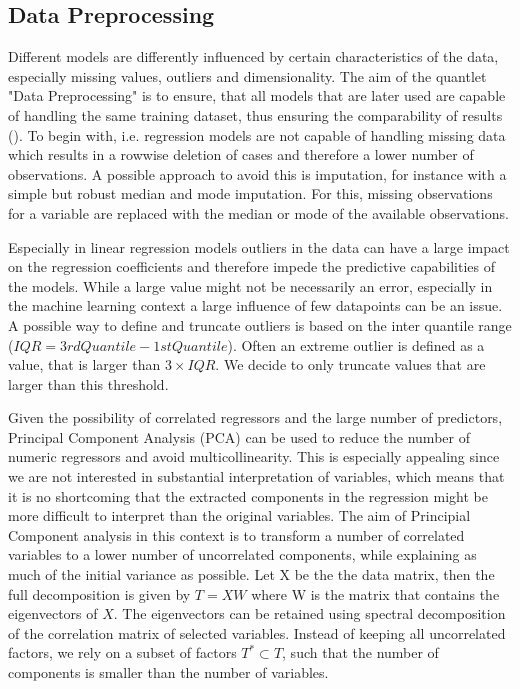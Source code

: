 \subsection{Data Preprocessing}\label{sec:data_theory}

Different models are differently influenced by certain characteristics of the data, especially missing values, outliers and dimensionality.  The aim of the quantlet "Data Preprocessing" is to ensure, that all models that are later used are capable of handling the same training dataset, thus ensuring the comparability of results (\cite{friedman_elements_2001}). 
To begin with, i.e. regression models are not capable of handling missing data which results in a rowwise deletion of cases and therefore a lower number of observations. A possible approach to avoid this is  imputation, for instance with a simple but robust median and mode imputation. For this, missing observations for a variable are replaced with the median or mode of the available observations.

Especially in linear regression models outliers in the data can have a large impact on the regression coefficients and therefore impede the predictive  capabilities of the  models. While a large value might not be necessarily an error, especially in the machine learning context a large influence of few datapoints can be an issue. A possible way to define and truncate outliers is based on the inter quantile range ($IQR = 3rd Quantile -1st Quantile$).
Often an extreme outlier is defined as a value, that is larger than $3 \times IQR$. We decide to only truncate values that are larger than this threshold. 

Given the possibility of correlated regressors and the large number of predictors, Principal Component Analysis (PCA) can be used to reduce the number of numeric regressors and avoid multicollinearity. This is especially appealing since we are not interested in substantial interpretation of variables, which means that it is no shortcoming that the extracted components in the regression might be more difficult to interpret than the original variables. 
The aim of Principial Component analysis in this context is to transform a number of correlated variables to a lower number of uncorrelated components, while explaining as much of the initial variance as possible. 
Let X be the the data matrix, then the full decomposition is given by   $  T = XW $
where W is the matrix that contains the eigenvectors of $X$.  
The eigenvectors can be retained using spectral decomposition of the correlation matrix of selected variables.
Instead of keeping all uncorrelated factors, we rely on a subset of factors $T^* \subset T$, such that the number of components is smaller than the number of variables.
 
